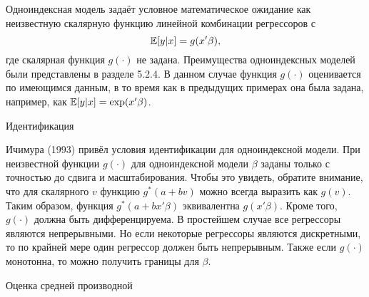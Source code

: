 Одноиндексная модель задаёт условное математическое ожидание как неизвестную скалярную функцию линейной комбинации регрессоров с 
\begin{equation}
\mathbb{E}[y|x] = g(x'\beta),
\end{equation}
где скалярная функция $g(\cdot)$ не задана. Преимущества одноиндексных моделей были представлены в разделе 5.2.4. В данном случае функция $g(\cdot)$ оценивается по имеющимся данным, в то время как в предыдущих примерах она была задана, например, как $\mathbb{E}[y|x] = \exp(x'\beta)$.

\begin{center}
Идентификация
\end{center}

Ичимура (1993) привёл условия идентификации для одноиндексной модели. При неизвестной функции $g(\cdot)$ для одноиндексной модели $\beta$ заданы только с точностью до сдвига и масштабирования. Чтобы это увидеть, обратите внимание, что для скалярного $v$ функцию $g^*(a + bv)$ можно всегда выразить как $g(v)$. Таким образом, функция $g^*(a + bx'\beta)$ эквивалентна $g(x'\beta)$. Кроме того, $g(\cdot)$ должна быть дифференцируема. В простейшем случае все регрессоры являются непрерывными. Но если некоторые регрессоры являются дискретными, то по крайней мере один регрессор должен быть непрерывным. Также если $g(\cdot)$ монотонна, то можно получить границы для $\beta$.

\begin{center}
Оценка средней производной
\end{center}

